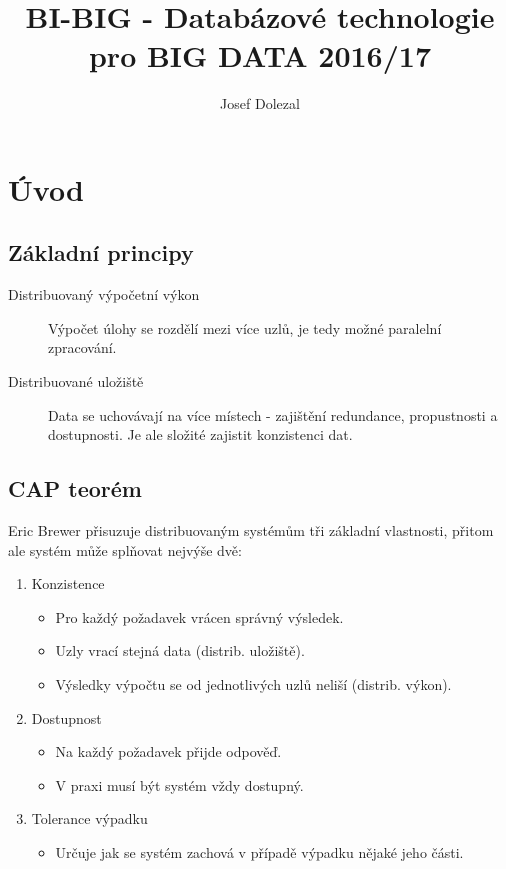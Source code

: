 \documentclass{article}
\title{BI-BIG - Databázové technologie pro BIG DATA 2016/17}
\author{Josef Dolezal}
\begin{document}
\tableofcontents

\newpage

\section{Úvod}
  \subsection{Základní principy}
  \begin{description}
    \item[Distribuovaný výpočetní výkon] Výpočet úlohy se rozdělí mezi více uzlů, je tedy možné paralelní zpracování.
    \item[Distribuované uložiště] Data se uchovávají na více místech - zajištění redundance, propustnosti a dostupnosti.
    Je ale složité zajistit konzistenci dat.
  \end{description}

  \subsection{CAP teorém}
    Eric Brewer přisuzuje distribuovaným systémům tři základní vlastnosti, přitom ale systém může splňovat nejvýše dvě:
    \begin{enumerate}
      \item Konzistence
        \begin{itemize}
          \item Pro každý požadavek vrácen správný výsledek.
          \item Uzly vrací stejná data (distrib. uložiště).
          \item Výsledky výpočtu se od jednotlivých uzlů neliší (distrib. výkon).
        \end{itemize}
      \item Dostupnost
        \begin{itemize}
          \item Na každý požadavek přijde odpověď.
          \item V praxi musí být systém vždy dostupný.
        \end{itemize}
      \item Tolerance výpadku
        \begin{itemize}
          \item Určuje jak se systém zachová v případě výpadku nějaké jeho části.
        \end{itemize}
    \end{enumerate}
\end{document}
